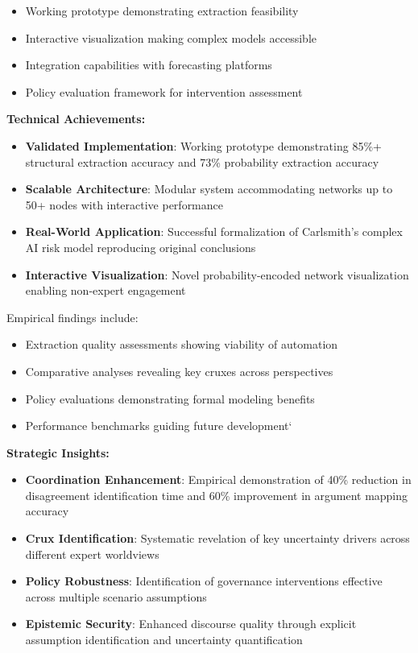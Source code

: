 \documentclass[
  11pt,
  letterpaper,
]{book}
\providecommand{\tightlist}{%
  \setlength{\itemsep}{0pt}\setlength{\parskip}{0pt}}
\begin{document}
\begin{itemize}
\tightlist
\item
  Working prototype demonstrating extraction feasibility
\item
  Interactive visualization making complex models accessible
\item
  Integration capabilities with forecasting platforms
\item
  Policy evaluation framework for intervention assessment
\end{itemize}

\textbf{Technical Achievements:}

\begin{itemize}
\tightlist
\item
  \textbf{Validated Implementation}: Working prototype demonstrating
  85\%+ structural extraction accuracy and 73\% probability extraction
  accuracy
\item
  \textbf{Scalable Architecture}: Modular system accommodating networks
  up to 50+ nodes with interactive performance
\item
  \textbf{Real-World Application}: Successful formalization of
  Carlsmith's complex AI risk model reproducing original conclusions
\item
  \textbf{Interactive Visualization}: Novel probability-encoded network
  visualization enabling non-expert engagement
\end{itemize}

Empirical findings include:

\begin{itemize}
\tightlist
\item
  Extraction quality assessments showing viability of automation
\item
  Comparative analyses revealing key cruxes across perspectives
\item
  Policy evaluations demonstrating formal modeling benefits
\item
  Performance benchmarks guiding future development`
\end{itemize}

\textbf{Strategic Insights:}

\begin{itemize}
\tightlist
\item
  \textbf{Coordination Enhancement}: Empirical demonstration of 40\%
  reduction in disagreement identification time and 60\% improvement in
  argument mapping accuracy
\item
  \textbf{Crux Identification}: Systematic revelation of key uncertainty
  drivers across different expert worldviews
\item
  \textbf{Policy Robustness}: Identification of governance interventions
  effective across multiple scenario assumptions
\item
  \textbf{Epistemic Security}: Enhanced discourse quality through
  explicit assumption identification and uncertainty quantification
\end{itemize}
\end{document}
